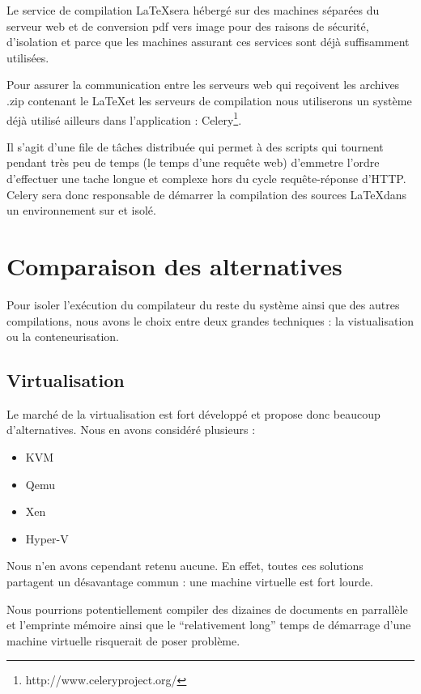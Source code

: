 \documentclass[10pt,a4paper]{article}
\begin{document}
Le service de compilation \LaTeX sera hébergé sur des machines séparées du serveur web et de conversion pdf vers image pour des raisons de sécurité, d'isolation et parce que les machines assurant ces services sont déjà suffisamment utilisées.

Pour assurer la communication entre les serveurs web qui reçoivent les archives .zip contenant le \LaTeX et les serveurs de compilation nous utiliserons un système déjà utilisé ailleurs dans l'application :
Celery\footnote{http://www.celeryproject.org/}.

Il s'agit d'une file de tâches distribuée qui permet à des scripts qui tournent pendant très peu de temps (le temps d'une requête web) d'emmetre l'ordre d'effectuer une tache longue et complexe hors du cycle requête-réponse d'HTTP.
Celery sera donc responsable de démarrer la compilation des sources \LaTeX dans un environnement sur et isolé.



\section{Comparaison des alternatives}
Pour isoler l'exécution du compilateur du reste du système ainsi que des autres compilations, nous avons le choix entre deux grandes techniques : la vistualisation ou la conteneurisation.

\subsection{Virtualisation}

Le marché de la virtualisation est fort développé et propose donc beaucoup d'alternatives. Nous en avons considéré plusieurs :

\begin{itemize}
    \item{KVM}
    \item{Qemu}
    \item{Xen}
    \item{Hyper-V}
\end{itemize}

Nous n'en avons cependant retenu aucune. En effet, toutes ces solutions partagent un désavantage commun : une machine virtuelle est fort lourde.

Nous pourrions potentiellement compiler des dizaines de documents en parrallèle et l'emprinte mémoire ainsi que le ``relativement long'' temps de démarrage d'une machine virtuelle risquerait de poser problème.
\end{document}
